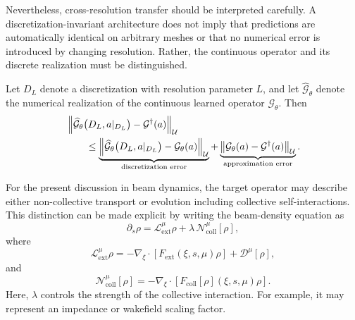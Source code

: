 Nevertheless, cross-resolution transfer should be interpreted carefully. A discretization-invariant architecture does not imply that predictions are automatically identical on arbitrary meshes or that no numerical error is introduced by changing resolution. Rather, the continuous operator and its discrete realization must be distinguished.

Let $D_L$ denote a discretization with resolution parameter $L$, and let
$\widehat{\mathcal{G}}_{\theta}$
denote the numerical realization of the continuous learned operator
$\mathcal{G}_{\theta}$.
Then
\begin{equation}
\begin{split}
&
\left\lVert
\widehat{\mathcal{G}}_{\theta}
\bigl(
D_L,
a|_{D_L}
\bigr)
-
\mathcal{G}^{\dagger}(a)
\right\rVert_{\mathcal{U}}
\\
&\qquad\le
\underbrace{
\left\lVert
\widehat{\mathcal{G}}_{\theta}
\bigl(
D_L,
a|_{D_L}
\bigr)
-
\mathcal{G}_{\theta}(a)
\right\rVert_{\mathcal{U}}
}_{\text{discretization error}}
+
\underbrace{
\left\lVert
\mathcal{G}_{\theta}(a)
-
\mathcal{G}^{\dagger}(a)
\right\rVert_{\mathcal{U}}
}_{\text{approximation error}}.
\end{split}
\label{eq:NO_error_decomp}
\end{equation}

For the present discussion in beam dynamics, the target operator may describe either non-collective transport or evolution including collective self-interactions. This distinction can be made explicit by writing the beam-density equation as
\begin{equation}
    \partial_s \rho
    =
    \mathcal{L}_{\mathrm{ext}}^{\mu}\rho
    +
    \lambda\,
    \mathcal{N}_{\mathrm{coll}}^{\mu}[\rho],
    \label{eq:collective_noncollective_split}
\end{equation}
where
\begin{equation}
    \mathcal{L}_{\mathrm{ext}}^{\mu}\rho
    =
    -
    \nabla_{\xi}\cdot
    \left[
        F_{\mathrm{ext}}(\xi,s,\mu)\rho
    \right]
    +
    \mathcal{D}^{\mu}[\rho],
\end{equation}
and
\begin{equation}
    \mathcal{N}_{\mathrm{coll}}^{\mu}[\rho]
    =
    -
    \nabla_{\xi}\cdot
    \left[
        F_{\mathrm{coll}}[\rho](\xi,s,\mu)\rho
    \right].
\end{equation}
Here, $\lambda$ controls the strength of the collective interaction. For example, it may represent an impedance or wakefield scaling factor.

